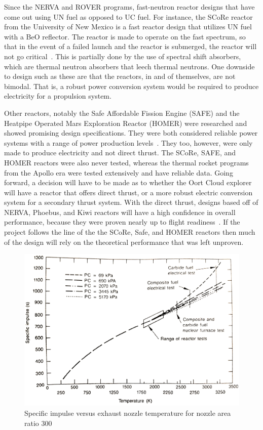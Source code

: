 \documentclass{article}
\begin{document}
Since the NERVA and ROVER programs, fast-neutron reactor designs that have come out using UN fuel as opposed to UC fuel. For instance, the SCoRe reactor from the University of New Mexico is a fast reactor design that  utilizes UN fuel with a BeO reflector. The reactor is made to operate on the fast spectrum, so that in the event of a failed launch and the reactor is submerged, the reactor will not go critical~\cite{hatton2009sectored}. This is partially done by the use of spectral shift absorbers, which are thermal neutron absorbers that leech thermal neutrons. One downside to design such as these are that the reactors, in and of themselves, are not bimodal. That is, a robust power conversion system would be required to produce electricity for a propulsion system.


Other reactors, notably the Safe Affordable Fission Engine (SAFE) and the Heatpipe Operated Mars Exploration Reactor (HOMER) were researched and showed promising design specifications. They were both considered reliable power systems with a range of power production levels~\cite{poston2001heatpipe,van2002testing}. They too, however, were only made to produce electricity and not direct thrust. The SCoRe, SAFE, and HOMER reactors were also never tested, whereas the thermal rocket programs from the Apollo era were tested extensively and have reliable data. Going forward, a decision will have to be made as to whether the Oort Cloud explorer will have a reactor that offers direct thrust, or a more robust electric conversion system for a secondary thrust system. With the direct thrust, designs based off of NERVA, Phoebus, and Kiwi reactors will have a high confidence in overall performance, because they were proven nearly up to flight readiness~\cite{buden2011space}. If the project follows the line of the the SCoRe, Safe, and HOMER reactors then much of the design will rely on the theoretical performance that was left unproven.



\begin{figure}[H]
	\centering
	\includegraphics[height=0.45\textheight]{fig/appW}
	\caption[Specific impulse versus exhaust nozzle temperature for nozzle area ratio 300]{Specific impulse versus exhaust nozzle temperature for nozzle area ratio 300~\cite{buden1970operational}}
	\label{appW}
\end{figure}
\end{document}
